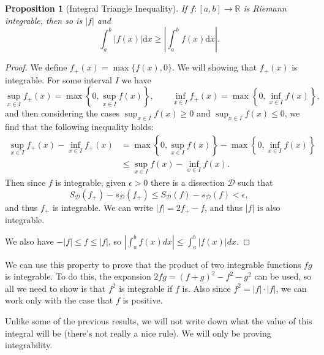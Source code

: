 \documentclass[11pt, a4paper]{article}
\newtheorem{proposition}[theorem]{Proposition}
\theoremstyle{definition}
\newcommand{\R}{\mathbb{R}}
\newcommand{\DD}{\mathcal{D}}
\newcommand{\dd}{\mathrm{d}}
\begin{document}
\begin{proposition}[Integral Triangle Inequality]
	If $f :[a, b] \rightarrow \R$ is Riemann integrable, then so is $|f|$ and
	$$
	\int_a^b |f(x) | \dd x \geq \left|\int_a^b f(x) \dd x\right|.
	$$
\end{proposition}
\begin{proof}
	We define $f_+(x) = \max\{f(x), 0\}$. We will showing that $f_+(x)$ is integrable. For some interval $I$ we have
	$$
	\sup_{x \in I} f_+(x) = \max\left\{0, \sup_{x \in I} f(x)\right\}, \quad \quad \inf_{x \in I} f_+(x) = \max\left\{0, \inf_{x \in I} f(x)\right\},
	$$
	and then considering the cases $\sup_{x \in I}f(x) \geq 0$ and $\sup_{x \in I}f(x) \leq 0$, we find that the following inequality holds:
	\begin{align*}
	\sup_{x \in I} f_+(x) - \inf_{x \in I} f_+(x) &= \max\left\{0, \sup_{x \in I} f(x)\right\} - \max\left\{0, \inf_{x \in I} f(x)\right\}  \\
	& \leq \sup_{x \in I} f(x) - \inf_{x \in I} f(x).
\end{align*}
Then since $f$ is integrable, given $\epsilon > 0$ there is a dissection $\DD$ such that
$$
S_{\DD}(f_+) - s_{\DD}(f_+) \leq S_{\DD}(f) - s_{\DD}(f) < \epsilon,
$$
and thus $f_+$ is integrable. We can write $|f| = 2f_+ - f$, and thus $|f|$ is also integrable.

We also have $-|f| \leq f \leq |f|$, so $\left|\int_{a}^{b} f(x) d x\right| \leq \int_{a}^{b}|f(x)| d x$.
\end{proof}

We can use this property to prove that the product of two integrable functions $fg$ is integrable. To do this, the expansion $2fg = (f + g)^2 - f^2 - g^2$ can be used, so all we need to show is that $f^2$ is integrable if $f$ is. Also since $f^2 = |f| \cdot |f|$, we can work only with the case that $f$ is positive.

Unlike some of the previous results, we will not write down what the value of this integral will be (there's not really a nice rule). We will only be proving integrability.
\end{document}
